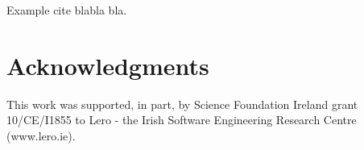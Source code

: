 \documentclass[runningheads,a4paper]{llncs}
\begin{document}
Example cite \cite{AbdelkaderLahmadi2005} blabla bla.



\section*{Acknowledgments}
This work was supported, in part, by Science Foundation Ireland grant 10/CE/I1855 to Lero - the Irish Software Engineering Research Centre (www.lero.ie).




\end{document}
